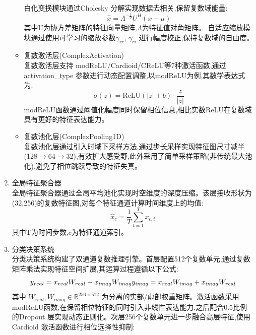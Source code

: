\documentclass{article}
\begin{document}
\begin{CJK}{UTF8}{gbsn}
\begin{enumerate}
\begin{itemize}
\begin{equation}
            \label{eq:covariance}
        \end{equation}
        白化变换模块通过Cholesky 分解实现数据去相关,保留复数域能量:
        \begin{equation}
            \hat{x}=\Lambda^{-\frac{1}{2}}U^{H}(x-\mu)
            \label{eq:whitening_transform}
        \end{equation}
        其中U为协方差矩阵的特征向量矩阵,$\Lambda$为特征值对角矩阵。
        自适应缩放模块通过使用可学习的缩放参数$\gamma_{rr}$, $\gamma_{ri}$ 进行幅度校正,保持复数域的自由度。
        \item 复数激活层(ComplexActivation) \\
        复数激活层支持 modReLU/Cardioid/CReLU等7种激活函数,通过 activation\_type 参数进行动态配置调整,以modReLU为例,其数学表达式为:
        \begin{equation}
            \sigma(z)=\text{ReLU}(|z|+b)\cdot\frac{z}{|z|}
            \label{eq:modrelu}
        \end{equation}
        modReLU函数通过阈值化幅度同时保留相位信息,相比实数ReLU在复数域具有更好的特征表达能力。
        \item 复数池化层(ComplexPooling1D) \\
        复数池化层通过引入时域下采样方法,通过步长采样实现特征图尺寸减半(128$\rightarrow$64$\rightarrow$32),有效扩大感受野,此外采用了简单采样策略(非传统最大池化),避免了相位跳跃导致的特征失真。
    \end{itemize}
    \item 全局特征聚合器 \\
    全局特征聚合器通过全局平均池化实现时空维度的深度压缩。该层接收形状为(32,256)的复数特征图,对每个特征通道计算时间维度上的均值:
    \begin{equation}
        \hat{x}_{c}=\frac{1}{T}\sum_{t=1}^{T}x_{c,t}
        \label{eq:global_avg_pooling}
    \end{equation}
    其中T为时间步数,c为特征通道索引。
    \item 分类决策系统 \\
    分类决策系统构建了双通道复数推理引擎。首层配置512个复数单元,通过复数矩阵乘法实现特征空间扩展,其运算过程遵循以下公式:
    \begin{equation}
        y_{real}=x_{real}W_{real}-x_{imag}W_{imag} \\
        y_{imag}=x_{real}W_{imag}+x_{imag}W_{real}
        \label{eq:complex_linear}
    \end{equation}
    其中 $W_{real},W_{imag}\in\mathbb{R}^{256\times512}$ 为分离的实部/虛部权重矩阵。激活函数采用 modReLU函数,在保留相位特征的同时引入非线性表达能力,之后配合0.5比例的Dropout 层实现动态正则化。次层256个复数单元进一步融合高层特征,使用Cardioid 激活函数进行相位选择性抑制:

\end{enumerate}
\end{CJK}
\end{document}
